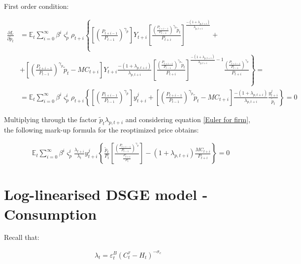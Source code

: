 \documentclass{pracamgr}
\numberwithin{equation}{section}
\begin{document}
First order condition:

\begin{align}
\frac{\partial L}{\partial \widetilde{p}_{t}} &= \mathbb{E}_{t}  \sum\limits_{i=0}^{\infty} \beta^{i} \varsigma_{p}^{i} \rho_{t+i} \left\{ \left[
\left(\frac{P_{t+i-1}}{P_{t-1}} \right)^{\gamma_{p}} \right] Y_{t+i} \left[ \frac{\left(\frac{P_{t+i-1}}{P_{t-1}} \right)^{\gamma_{p}}\widetilde{p}_{t}}{P_{t+i}} \right]^{\frac{-(1+\lambda_{p,t+i})}{\lambda_{p,t+i}}} \right. + \nonumber \\
& \left. + \left[\left(\frac{P_{t+i-1}}{P_{t-1}} \right)^{\gamma_{p}}\widetilde{p}_{t} -MC_{t+i} \right] Y_{t+i} \frac{-(1+\lambda_{p,t+i})}{\lambda_{p,t+i}} \left[ \frac{\left(\frac{P_{t+i-1}}{P_{t-1}} \right)^{\gamma_{p}}\widetilde{p}_{t}}{P_{t+i}} \right]^{\frac{-(1+\lambda_{p,t+i})}{\lambda_{p,t+i}}-1} \frac{\left(\frac{P_{t+i-1}}{P_{t-1}} \right)^{\gamma_{p}}}{P_{t+i}} \right\} = \nonumber \\
& = \mathbb{E}_{t}  \sum\limits_{i=0}^{\infty} \beta^{i} \varsigma_{p}^{i} \rho_{t+i} \left\{ \left[ \left(\frac{P_{t+i-1}}{P_{t-1}} \right)^{\gamma_{p}} \right] y^{j}_{t+i} + \left[\left(\frac{P_{t+i-1}}{P_{t-1}} \right)^{\gamma_{p}}\widetilde{p}_{t} -MC_{t+i} \right] \frac{-(1+\lambda_{p,t+i})}{\lambda_{p,t+i}} \frac{y_{t+i}^{j}}{\widetilde{p}_{t}} \right\} = 0
\end{align}

Multiplying through the factor $\widetilde{p}_{t} \lambda_{p,t+i}$ and considering equation \ref{Euler for firm}, the following mark-up formula for the reoptimized price obtains:

\begin{align}
&\mathbb{E}_{t}  \sum\limits_{i=0}^{\infty} \beta^{i} \varsigma_{p}^{i} \frac{\lambda_{t+i}}{\lambda_{t}} y_{t+i}^{j} \left\{ \frac{\widetilde{p}_{t}}{P_{t}} \left[ \frac{ \left(\frac{P_{t+i-1}}{P_{t-1}} \right)^{\gamma_{p}}}{\frac{P_{t+i}}{P_{t}}} \right] - (1+\lambda_{p,t+i})\frac{MC_{t+i}}{P_{t+i}} \right\} = 0
\end{align}

\section*{Log-linearised DSGE model - Consumption}

Recall that:

\begin{align}
\lambda_{t} = \varepsilon_{t}^{B} \left( C_{t}^{\tau} - H_{t} \right)^{-\sigma_{c}}
\end{align}
\end{document}
